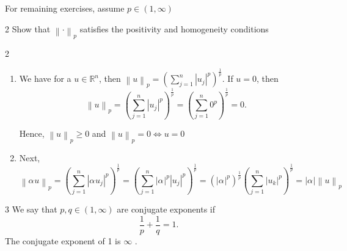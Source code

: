 \documentclass[a4paper,norsk]{article}
\renewcommand{\geq}{\geqslant}
\begin{document}
For remaining exercises, assume $ p \in \left( 1, \infty \right)  $ 

\begin{oppgavebox}{2}{}
Show that $ \left\lVert \cdot \right\rVert _p $ satisfies the positivity and homogeneity conditions

\begin{proofbox}{2}{}
  \begin{enumerate}
    \item We have for a $ u \in \mathbb{R} ^{n}$, then $ \left\lVert u \right\rVert _p = \left( \sum_{ j=1 }^{ n } \left| u_j \right| ^{p}  \right) ^{ \frac{ 1 }{ p }}   $. If $ u = 0 $, then
  \[
      \left\lVert u \right\rVert _p = \left( \sum_{ j=1 }^{ n } \left| u_j \right|^p   \right) ^{ \frac{ 1 }{ p }} = \left( \sum_{ j=1 }^{ n }  0^p  \right)  ^{ \frac{ 1 }{ p }} = 0.
  \]

  Hence, $ \left\lVert u \right\rVert _p \geq 0 $ and $ \left\lVert u \right\rVert _p = 0 \iff u = 0 $ 
  \item Next, 
   \[
      \left\lVert \alpha_{}^{} u \right\rVert_p = \left( \sum_{ j=1 }^{ n } \left| \alpha_{}^{} u_j \right| ^{p}   \right) ^{ \frac{ 1 }{ p }}  = \left( \sum_{ j=1 }^{ n } \left| \alpha_{}^{}  \right| ^{p} \left| u_j \right|^p    \right) ^{ \frac{ 1 }{ p }} = \left( \left| \alpha_{}^{}  \right| ^{p}  \right) ^{ \frac{ 1 }{ p }} \left( \sum_{ j=1 }^{ n } \left| u_k \right| ^{p}  \right) ^{ \frac{ 1 }{ p }} = \left| \alpha_{}^{}  \right| \left\lVert u \right\rVert _p 
  \]
  
  \end{enumerate}
  
\end{proofbox}
\end{oppgavebox}


\begin{definitionbox}{3}{}
We say that $ p, q \in  \left( 1, \infty \right)  $ are conjugate exponents if 
\[
    \frac{ 1 }{ p }+ \frac{ 1 }{ q } = 1.
\]
The conjugate exponent of 1 is $ \infty $ .
\end{definitionbox}
\end{document}
